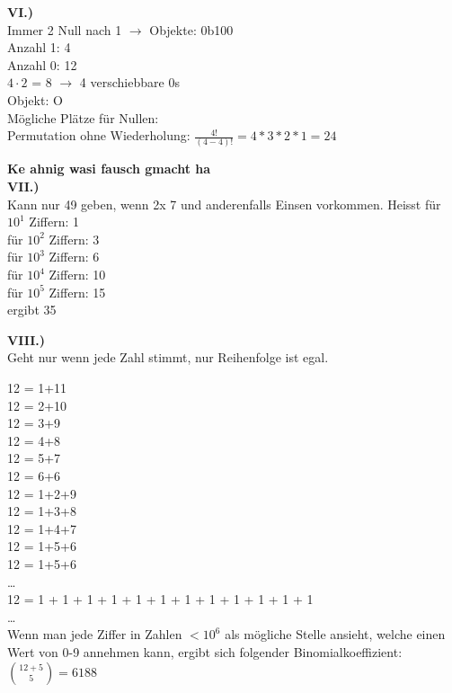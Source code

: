 \documentclass[12pt]{scrartcl}
\begin{document}
\textbf{VI.)}\\
Immer 2 Null nach 1 $\rightarrow$ Objekte: 0b100\\
Anzahl 1: 4\\
Anzahl 0: 12\\

$4 \cdot 2$ = 8 $\rightarrow$ 4 verschiebbare 0s\\

Objekt: O\\

Mögliche Plätze für Nullen: \\

Permutation ohne Wiederholung:
$\frac{4!}{(4-4)!} = 4*3*2*1 = 24$

\textbf{Ke ahnig wasi fausch gmacht ha}\\


\textbf{VII.)}\\
Kann nur 49 geben, wenn 2x 7 und anderenfalls Einsen vorkommen.
Heisst für $10^1$ Ziffern: 1\\
für $10^2$ Ziffern: 3\\
für $10^3$ Ziffern: 6\\
für $10^4$ Ziffern: 10\\
für $10^5$ Ziffern: 15\\

ergibt 35


\textbf{VIII.)}\\
Geht nur wenn jede Zahl stimmt, nur Reihenfolge ist egal.


12 = 1+11\\
12 = 2+10\\
12 = 3+9\\
12 = 4+8\\
12 = 5+7\\
12 = 6+6\\
12 = 1+2+9\\
12 = 1+3+8\\
12 = 1+4+7\\
12 = 1+5+6\\
12 = 1+5+6\\
\dots\\
12 = 1 + 1 + 1 + 1 + 1 + 1 + 1 + 1 + 1 + 1 + 1 + 1\\
\dots\\

Wenn man jede Ziffer in Zahlen $< 10^6$ als mögliche Stelle ansieht, welche einen
Wert von 0-9 annehmen kann, ergibt sich folgender Binomialkoeffizient:\\
$\binom{12+5}{5} = 6188$\\
\end{document}
